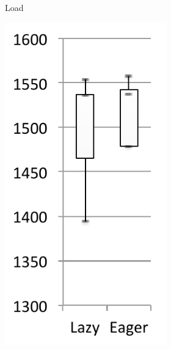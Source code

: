 \documentclass[sigplan,10pt,review,anonymous]{acmart}\settopmatter{printfolios=true,printccs=false,printacmref=false}
\begin{document}
\begin{figure}[bth]
\begin{subfigure}[b]{.48\textwidth}
\begin{subfigure}[b]{.28\textwidth}
    		\caption{Load}
       	\end{subfigure}\hspace{.03\textwidth}%
       	\begin{subfigure}[b]{.28\textwidth}
    		\includegraphics[width=\linewidth]{figures/wildflyExpExecTime} 

\end{subfigure}
\end{subfigure}
\end{figure}
\end{document}
